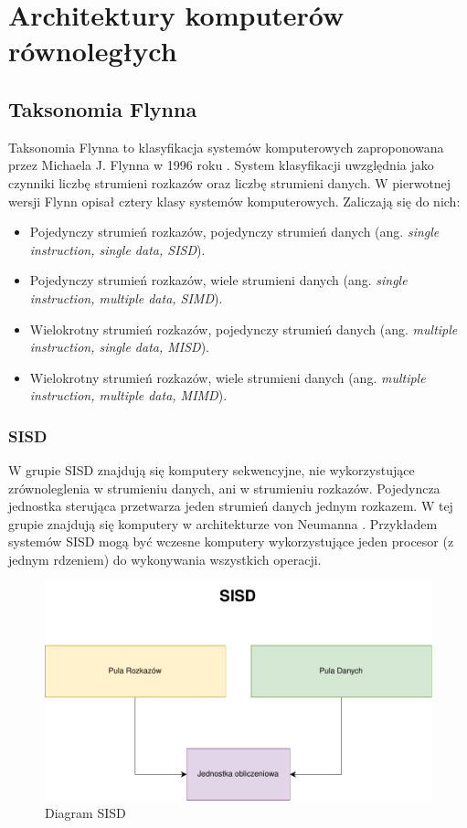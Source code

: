 \documentclass[a4paper,12pt]{book} %
\begin{document}
\section{Architektury komputerów równoległych}


\subsection{Taksonomia Flynna}
Taksonomia Flynna to klasyfikacja systemów komputerowych zaproponowana przez Michaela J. Flynna w 1996 roku \cite{Flynn1966}. System klasyfikacji uwzględnia jako czynniki liczbę strumieni rozkazów oraz liczbę strumieni danych.
W pierwotnej wersji Flynn opisał cztery klasy systemów komputerowych. Zaliczają się do nich:
\begin{itemize}[topsep=1pt, itemsep=0.5pt]
	\item Pojedynczy strumień rozkazów, pojedynczy strumień danych (ang. \emph{single instruction, single data, SISD}).
	\item Pojedynczy strumień rozkazów, wiele strumieni danych (ang. \emph{single instruction, multiple data, SIMD}).
	\item Wielokrotny strumień rozkazów, pojedynczy strumień danych (ang. \emph{multiple instruction, single data, MISD}).
	\item Wielokrotny strumień rozkazów, wiele strumieni danych (ang. \emph{multiple instruction, multiple data, MIMD}).
\end{itemize}
\newpage

\subsubsection{SISD}
W grupie SISD znajdują się komputery sekwencyjne, nie wykorzystujące zrównoleglenia w strumieniu danych, ani w strumieniu rozkazów. Pojedyncza jednostka sterująca przetwarza jeden strumień danych jednym rozkazem. W tej grupie znajdują się komputery w architekturze von Neumanna \cite{Neumann}. Przykładem systemów SISD mogą być wczesne komputery wykorzystujące jeden procesor (z jednym rdzeniem) do wykonywania wszystkich operacji.
\begin{figure}[h]
	\centering
	\includegraphics[scale=0.7]{assets/SISD.pdf}
	\caption{Diagram SISD}
	\label{SISD}
\end{figure}
\end{document}
